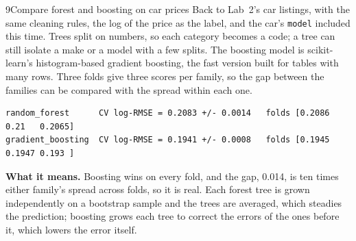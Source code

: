 
\begin{labquestion}{9}{Compare forest and boosting on car prices}
Back to Lab~2's car listings, with the same cleaning rules, the log of the price as the label, and the car's \texttt{model} included this time. Trees split on numbers, so each category becomes a code; a tree can still isolate a make or a model with a few splits. The boosting model is scikit-learn's histogram-based gradient boosting, the fast version built for tables with many rows. Three folds give three scores per family, so the gap between the families can be compared with the spread within each one.
\end{labquestion}
\begin{labanswer}

\begin{refoutput}
\begin{lstlisting}[style=utpterminal]
random_forest      CV log-RMSE = 0.2083 +/- 0.0014   folds [0.2086 0.21   0.2065]
gradient_boosting  CV log-RMSE = 0.1941 +/- 0.0008   folds [0.1945 0.1947 0.193 ]
\end{lstlisting}
\end{refoutput}

\textbf{What it means.} Boosting wins on every fold, and the gap, 0.014, is ten times either family's spread across folds, so it is real. Each forest tree is grown independently on a bootstrap sample and the trees are averaged, which steadies the prediction; boosting grows each tree to correct the errors of the ones before it, which lowers the error itself.
\end{labanswer}

